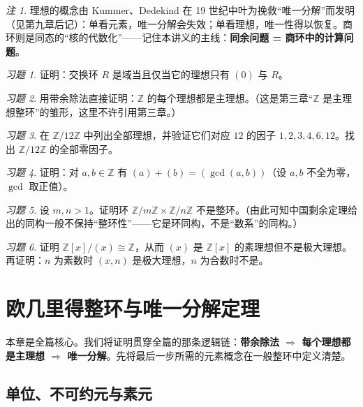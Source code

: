 \documentclass[a4paper,11pt]{ctexart}
\numberwithin{equation}{section}
\theoremstyle{plain}
\theoremstyle{definition}
\theoremstyle{remark}
\newtheorem{remark}[theorem]{注}
\newtheorem{exercise}{习题}[section]
\newcommand{\Z}{\mathbb{Z}}
\begin{document}
\begin{remark}
理想的概念由 Kummer、Dedekind 在 19 世纪中叶为挽救“唯一分解”而发明（见第九章后记）：单看元素，唯一分解会失效；单看理想，唯一性得以恢复。商环则是同态的“核的代数化”——记住本讲义的主线：\textbf{同余问题 = 商环中的计算问题}。
\end{remark}

\begin{exercise}\label{ex:2-1}
证明：交换环 $R$ 是域当且仅当它的理想只有 $(0)$ 与 $R$。
\end{exercise}

\begin{exercise}\label{ex:2-2}
用带余除法直接证明：$\Z$ 的每个理想都是主理想。（这是第三章“$\Z$ 是主理想整环”的雏形，这里不许引用第三章。）
\end{exercise}

\begin{exercise}\label{ex:2-3}
在 $\Z/12\Z$ 中列出全部理想，并验证它们对应 $12$ 的因子 $1,2,3,4,6,12$。找出 $\Z/12\Z$ 的全部零因子。
\end{exercise}

\begin{exercise}\label{ex:2-4}
证明：对 $a,b\in\Z$ 有 $(a)+(b)=(\gcd(a,b))$（设 $a,b$ 不全为零，$\gcd$ 取正值）。
\end{exercise}

\begin{exercise}\label{ex:2-5}
设 $m,n>1$。证明环 $\Z/m\Z\times \Z/n\Z$ 不是整环。（由此可知中国剩余定理给出的同构一般不保持“整环性”——它是环同构，不是“数系”的同构。）
\end{exercise}

\begin{exercise}\label{ex:2-6}
证明 $\Z[x]/(x)\cong\Z$，从而 $(x)$ 是 $\Z[x]$ 的素理想但不是极大理想。再证明：$n$ 为素数时 $(x,n)$ 是极大理想，$n$ 为合数时不是。
\end{exercise}

\newpage

\section{欧几里得整环与唯一分解定理}\label{sec:UFD}

本章是全篇核心。我们将证明贯穿全篇的那条逻辑链：\textbf{带余除法 $\Rightarrow$ 每个理想都是主理想 $\Rightarrow$ 唯一分解}。先将最后一步所需的元素概念在一般整环中定义清楚。

\subsection{单位、不可约元与素元}
\end{document}
